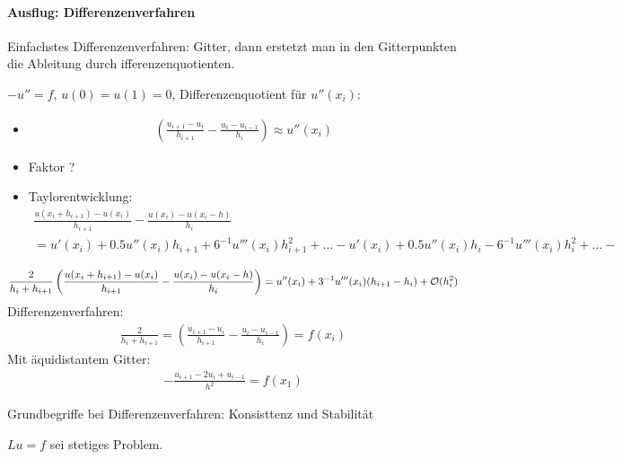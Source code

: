 \paragraph{Ausflug: Differenzenverfahren} Einfachstes Differenzenverfahren: Gitter, dann erstetzt man in den Gitterpunkten die Ableitung durch ifferenzenquotienten.
\begin{beispiel}
  $-u'' = f$, $u(0)= u(1) = 0$, Differenzenquotient für $u''(x_i)$:
  \begin{itemize}
  \item
    \begin{align*}
      \left( \frac{u_{i+1}-u_i}{h_{i+1}}- \frac{u_{i}-u_{i-1}}{h_{i}}\right) \approx u''(x_i)
    \end{align*}
\item Faktor ?
\item Taylorentwicklung:
  \begin{align*}
    \frac{u(x_i+h_{i+1})-u(x_i)}{h_{i+1}}- \frac{u(x_{i})-u(x_i-h)}{h_{i}}\\
= u'(x_i) + 0.5 u''(x_i)h_{i+1} + 6^{-1}u'''(x_i)h_{i+1}^2 + \dots - u'(x_i) + 0.5 u''(x_i)h_{i} - 6^{-1}u'''(x_i)h_{i}^2 + \dots -
  \end{align*}
  \end{itemize}

  \begin{align*}
    \frac{2}{h_i + h_{i+1}}\left(\frac{u(x_i + h_{i+1})-u(x_i)}{h_{i+1}}-\frac{u(x_i) - u(x_i-h)}{h_{i}} \right) = u''(x_i) + 3^{-1}u'''(x_i)(h_{i+1}-h_i) + {\cal O}(h_i^2)
  \end{align*}
Differenzenverfahren:
\begin{align*}
  \frac{2}{h_i + h_{i+1}} = \left( \frac{u_{i+1}-u_i}{h_{i+1}}-\frac{u_i - u_{i-1}}{h_i} \right) = f(x_i)
\end{align*}
Mit äquidistantem Gitter:
\begin{align*}
  -\frac{u_{i+1}-2 u_i + u_{i-1}}{h^2} = f(x_1)
\end{align*}

\end{beispiel}

Grundbegriffe bei Differenzenverfahren: Konsisttenz und Stabilität

$Lu = f$ sei stetiges Problem. 

